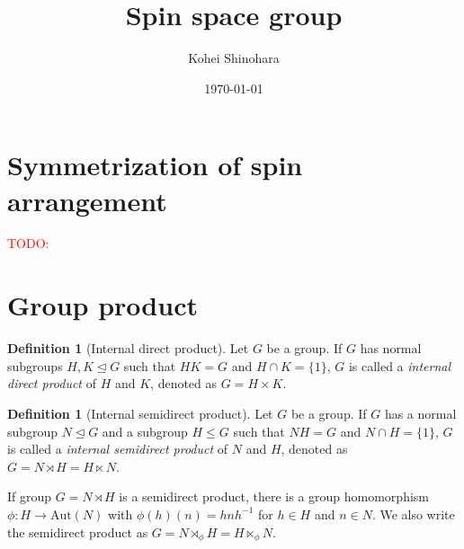 \documentclass[a4paper, 11pt]{article}
\title{Spin space group}
\author{Kohei Shinohara}
\date{\today}
\theoremstyle{definition}
\newcommand{\term}[1]{\textit{#1}}
\newcommand{\todo}[1]{\textcolor{red}{TODO: #1}}
\newtheorem{definition}[theorem]{Definition}
\begin{document}
\maketitle
\tableofcontents







\section{Symmetrization of spin arrangement}

\todo{}

\appendix


% 

\section{\label{appx:group}Group product}

\begin{screen}
  \begin{definition}[Internal direct product]
    Let $G$ be a group.
    If $G$ has normal subgroups $H, K \trianglelefteq G$ such that $HK = G$ and $H \cap K = \{ 1 \}$, $G$ is called a \term{internal direct product} of $H$ and $K$, denoted as $G = H \times K$.
  \end{definition}
\end{screen}

\begin{screen}
  \begin{definition}[Internal semidirect product]
    Let $G$ be a group.
    If $G$ has a normal subgroup $N \trianglelefteq G$ and a subgroup $H \leq G$ such that $NH = G$ and $N \cap H = \{ 1 \}$, $G$ is called a \term{internal semidirect product} of $N$ and $H$, denoted as $G = N \rtimes H = H \ltimes N$.
  \end{definition}
\end{screen}

If group $G = N \rtimes H$ is a semidirect product, there is a group homomorphism $\phi: H \to \mathrm{Aut}(N)$ with $\phi(h)(n) = h n h^{-1}$ for $h \in H$ and $n \in N$.
We also write the semidirect product as $G = N \rtimes_{\phi} H = H \ltimes_{\phi} N$.
\end{document}
